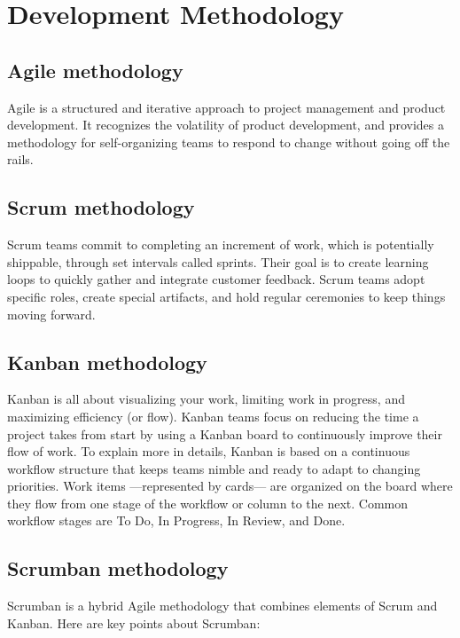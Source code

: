 \section{Development Methodology}
\subsection{Agile methodology}
Agile is a structured and iterative approach to project management and product development.
It recognizes the volatility of product development, and provides a methodology for self-organizing teams to respond to change without going off the rails.

\subsection{Scrum methodology}
Scrum teams commit to completing an increment of work, which is potentially shippable, through set intervals called sprints.
Their goal is to create learning loops to quickly gather and integrate customer feedback.
Scrum teams adopt specific roles, create special artifacts, and hold regular ceremonies to keep things moving forward.

\subsection{Kanban methodology}
Kanban is all about visualizing your work, limiting work in progress, and maximizing efficiency (or flow).
Kanban teams focus on reducing the time a project takes from start by using a Kanban board to continuously improve their flow of work.
To explain more in details, Kanban is based on a continuous workflow structure that keeps teams nimble and ready to adapt to changing priorities.
Work items —represented by cards— are organized on the board where they flow from one stage of the workflow or column to the next.
Common workflow stages are To Do, In Progress, In Review, and Done.

\subsection{Scrumban methodology}
Scrumban is a hybrid Agile methodology that combines elements of Scrum and Kanban. Here are key points about Scrumban:

